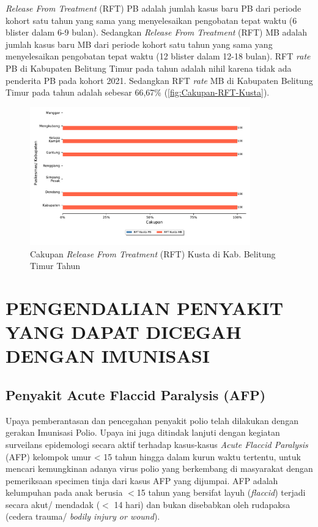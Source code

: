 \emph{Release From Treatment} (RFT) PB adalah jumlah kasus baru PB dari periode kohort satu tahun yang sama yang menyelesaikan pengobatan tepat waktu (6 blister dalam 6-9 bulan).
Sedangkan \emph{Release From Treatment} (RFT) MB adalah jumlah kasus baru MB dari periode kohort satu tahun yang sama yang menyelesaikan pengobatan tepat waktu (12 blister dalam 12-18 bulan).
RFT \emph{rate} PB di Kabupaten Belitung Timur pada tahun \tP adalah nihil karena tidak ada penderita PB pada kohort 2021. Sedangkan RFT \emph{rate} MB di Kabupaten Belitung Timur pada tahun \tP adalah sebesar 66,67\% (\autoref{fig:Cakupan-RFT-Kusta}).

\begin{figure}[H]
  \centering
  \includegraphics[width=0.85\textwidth]{bab_06/bab_06_06c_RFTkusta}
  \caption{Cakupan \emph{Release From Treatment} (RFT) Kusta di Kab. Belitung Timur Tahun \tP}
  \label{fig:Cakupan-RFT-Kusta}
\end{figure}

\section[PENGENDALIAN PD3I]{PENGENDALIAN PENYAKIT YANG DAPAT DICEGAH DENGAN IMUNISASI}
\subsection{Penyakit Acute Flaccid Paralysis (AFP)}
Upaya pemberantasan dan pencegahan penyakit polio telah dilakukan dengan gerakan Imunisasi Polio.
Upaya ini juga ditindak lanjuti dengan kegiatan surveilans epidemologi secara aktif terhadap kasus-kasus \emph{Acute Flaccid Paralysis} (AFP) kelompok umur < 15 tahun hingga dalam kurun waktu tertentu, untuk mencari kemungkinan adanya virus polio yang berkembang di masyarakat dengan pemeriksaan specimen tinja dari kasus AFP yang dijumpai.
AFP adalah kelumpuhan pada anak berusia $<$15 tahun yang bersifat layuh (\emph{flaccid}) terjadi secara akut/ mendadak ($<$ 14 hari) dan bukan disebabkan oleh rudapaksa (cedera trauma/ \emph{bodily injury or wound}).

